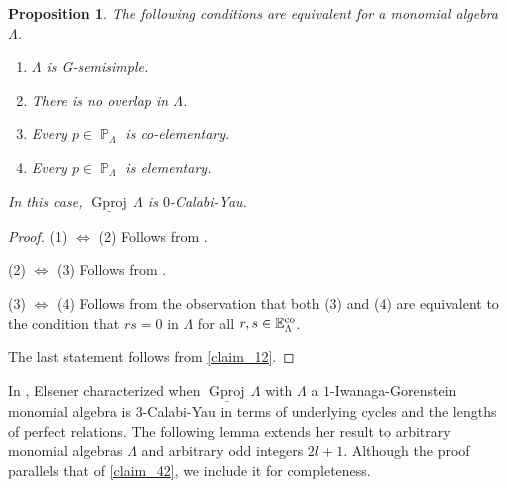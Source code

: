 \documentclass[12pt]{amsart}
\numberwithin{equation}{subsection}
\theoremstyle{plain}
\newtheorem{proposition}[theorem]{Proposition}
\theoremstyle{definition}
\newcommand{\sGproj}{\underline{\operatorname{Gproj}}\,}
\renewcommand{\P}{\operatorname{\mathbb{P}}\nolimits}
\renewcommand{\L}{\Lambda}
\newcommand{\Eco}{\mathbb{E}^{\rm co}}
\begin{document}
\begin{proposition}\label{claim_28}
The following conditions are equivalent for a monomial algebra $\L$.
\begin{enumerate}
\item $\L$ is G-semisimple.
\item There is no overlap in $\L$.
\item Every $p\in\P_\L$ is co-elementary.
\item Every $p\in\P_\L$ is elementary.
\end{enumerate}
In this case,  $\sGproj\L$ is $0$-Calabi-Yau.
\end{proposition}
\begin{proof}
(1) $\Leftrightarrow$ (2)
Follows from \cite[Proposition 5.9]{Chen-Shen-Zhou_2018}. 




(2) $\Leftrightarrow$ (3)
Follows from \cite[Proposition 4.4]{Honma-Usui_2025}.




(3) $\Leftrightarrow$ (4)
Follows from the observation that both (3) and (4) are equivalent to the condition that $rs=0$ in $\L$ for all $r, s\in\Eco_\L$.


The last statement follows from \cref{claim_12}.
\end{proof}






In \cite[Lemma 3.3]{Elsener_2021}, Elsener characterized when  $\sGproj\L$ with $\L$ a $1$-Iwanaga-Gorenstein monomial algebra  is $3$-Calabi-Yau in terms of underlying cycles and the lengths of perfect relations.
The following lemma extends her result to arbitrary monomial algebras $\L$ and arbitrary odd integers $2l+1$.
Although the proof parallels that of \cref{claim_42}, we include it for completeness.
\end{document}
